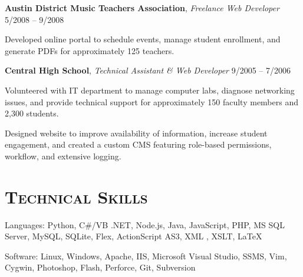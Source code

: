 \documentclass[12pt,a4paper]{article}
\newcommand{\sectionhead}{\normalfont\normalsize\scshape}
\newcommand{\workhead}[3]{\textbf{#1}, \emph{#2} \hfill #3}
\newcommand{\li}{\item[--]}
\begin{document}
\begin{description}[leftmargin=0em]
    \item
        \workhead{Austin District Music Teachers Association}{Freelance Web Developer}{5/2008 -- 9/2008}
        \begin{itemize*}
            \li Developed online portal to schedule events, manage student enrollment, and generate PDFs for approximately 125 teachers.
        \end{itemize*}


    \item
        \workhead{Central High School}{Technical Assistant \& Web Developer}{9/2005 -- 7/2006}
        \begin{itemize*}
            \li Volunteered with IT department to manage computer labs, diagnose networking issues, and provide technical support for approximately 150 faculty members and 2,300 
students.
            \li Designed website to improve availability of information, increase student engagement, and created a custom CMS featuring role-based permissions, workflow, and extensive logging.
        \end{itemize*}
\end{description}

\section*{\sectionhead Technical Skills}
\begin{description}
    \itemsep0pt
    \parskip5pt
    \item Languages: Python, C\#/VB .NET, Node.js, Java, JavaScript, PHP, MS SQL Server, MySQL, SQLite, Flex, ActionScript AS3, XML \Smiley, XSLT, \LaTeX
    \item Software: Linux, Windows, Apache, IIS, Microsoft Visual Studio, SSMS, Vim, Cygwin, Photoshop, Flash, Perforce, Git, Subversion
\end{description}
\end{document}
